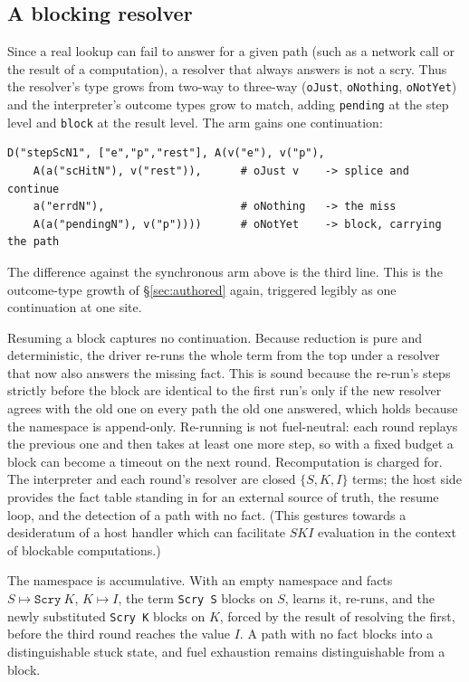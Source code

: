\documentclass[review]{jfp-epi}
\begin{document}
\subsection{A blocking resolver}\label{sec:block}

Since a real lookup can fail to answer for a given path (such as a
network call or the result of a computation), a resolver that always
answers is not a scry. Thus the resolver's type grows from two-way to
three-way (\texttt{oJust}, \texttt{oNothing}, \texttt{oNotYet}) and the
interpreter's outcome types grow to match, adding \texttt{pending} at the
step level and \texttt{block} at the result level. The arm gains one
continuation:
\begin{verbatim}
D("stepScN1", ["e","p","rest"], A(v("e"), v("p"),
    A(a("scHitN"), v("rest")),      # oJust v    -> splice and continue
    a("errdN"),                     # oNothing   -> the miss
    A(a("pendingN"), v("p"))))      # oNotYet    -> block, carrying the path
\end{verbatim}
The difference against the synchronous arm above is the third line.
This is the outcome-type growth of \S\ref{sec:authored} again, triggered
legibly as one continuation at one site.

Resuming a block captures no continuation. Because reduction is pure and
deterministic, the driver re-runs the whole term from the top under a
resolver that now also answers the missing fact. This is sound because
the re-run's steps strictly before the block are identical
to the first run's only if the new resolver agrees with the old one on
every path the old one answered, which holds because the namespace is
append-only. Re-running is not fuel-neutral: each round replays the
previous one and then takes at least one more step, so with a fixed
budget a block can become a timeout on the next round. Recomputation is
charged for. The interpreter and each round's resolver are closed
$\{S,K,I\}$ terms; the host side provides the fact table standing in for
an external source of truth, the resume loop, and the detection of a
path with no fact.  (This gestures towards a desideratum of a host
handler which can facilitate $SKI$ evaluation in the context of
blockable computations.)

The namespace is accumulative. With an empty namespace and facts $S
\mapsto \texttt{Scry}\ K$, \mbox{$K \mapsto I$}, the term \texttt{Scry S}
blocks on $S$, learns it, re-runs, and the newly substituted
\texttt{Scry K} blocks on $K$, forced by the result of resolving
the first, before the third round reaches the value $I$. A path with no
fact blocks into a distinguishable stuck state, and fuel exhaustion
remains distinguishable from a block.
\end{document}
